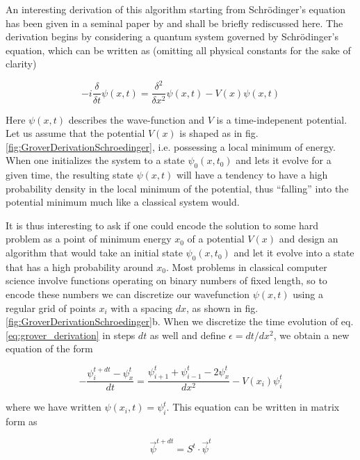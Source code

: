 An interesting derivation of this algorithm starting from Schrödinger's equation has been given in a seminal paper by \cite{grover_schrodingers_2001} and shall be briefly rediscussed here. The derivation begins by considering a quantum system governed by Schrödinger's equation, which can be written as (omitting all physical constants for the sake of clarity)

\begin{equation}
-i\frac{\delta}{\delta t}\psi(x,t) = \frac{\delta^2}{\delta x^2}\psi(x,t)-V(x)\psi(x,t) \label{eq:grover_derivation}
\end{equation}

Here $\psi(x,t)$ describes the wave-function and $V$ is a time-indepenent potential. Let us assume that the potential $V(x)$ is shaped as in fig. \ref{fig:GroverDerivationSchroedinger}, i.e. possessing a local minimum of energy. When one initializes the system to a state $\psi_0(x,t_0)$ and lets it evolve for a given time, the resulting state $\psi(x,t)$ will have a tendency to have a high probability density in the local minimum of the potential, thus ``falling'' into the potential minimum much like a classical system would.

It is thus interesting to ask if one could encode the solution to some hard problem as a point of minimum energy $x_0$ of a potential $V(x)$ and design an algorithm that would take an initial state $\psi_0(x,t_0)$ and let it evolve into a state that has a high probability around $x_0$. Most problems in classical computer science involve functions operating on binary numbers of fixed length, so to encode these numbers we can discretize our wavefunction $\psi(x,t)$ using a regular grid of points $x_i$ with a spacing $dx$, as shown in fig. \ref{fig:GroverDerivationSchroedinger}b. When we discretize the time evolution of eq. \ref{eq:grover_derivation} in steps $dt$ as well and define $\epsilon = dt/dx^2$, we obtain a new equation of the form

\begin{equation}
-\frac{\psi_i^{t+dt}-\psi_x^{t}}{dt} = \frac{\psi_{i+1}^t+\psi_{i-1}^t-2\psi_x^t}{dx^2} -V(x_i)\psi_i^t
\end{equation}

where we have written $\psi(x_i,t)=\psi_i^t$. This equation can be written in matrix form as

\begin{equation}
\vec{\psi}^{t+dt} = S^t  \cdot \vec{\psi}^t
\end{equation}

